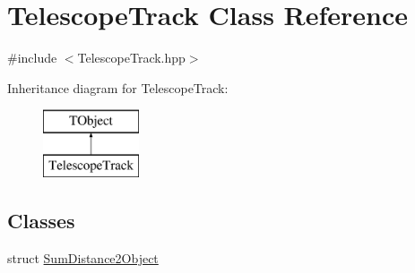 \hypertarget{class_telescope_track}{}\section{Telescope\+Track Class Reference}
\label{class_telescope_track}


{\ttfamily \#include $<$Telescope\+Track.\+hpp$>$}

Inheritance diagram for Telescope\+Track\+:\begin{figure}[H]
\begin{center}
\leavevmode
\includegraphics[height=2.000000cm]{class_telescope_track}
\end{center}
\end{figure}
\subsection*{Classes}
\begin{DoxyCompactItemize}
\item 
struct \mbox{\hyperlink{struct_telescope_track_1_1_sum_distance2_object}{Sum\+Distance2\+Object}}
\end{DoxyCompactItemize}
